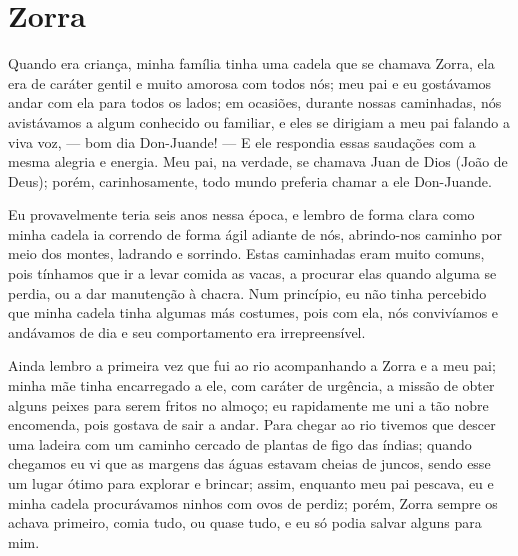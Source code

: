 \cleardoublepage
\newpage
{}
\chapter{Zorra}


Quando era criança, minha família tinha uma cadela que se chamava Zorra, ela era de caráter gentil e muito amorosa com todos nós; meu pai e eu gostávamos andar com ela para todos os lados; em ocasiões, durante nossas caminhadas, nós avistávamos a algum conhecido ou familiar, e eles se dirigiam a meu pai falando a viva voz, --- bom dia Don-Juande! --- E ele respondia essas saudações com a mesma alegria e energia.
Meu pai, na verdade, se chamava Juan de Dios (João de Deus); porém, carinhosamente, todo mundo preferia chamar a ele Don-Juande.


Eu provavelmente teria seis anos nessa época, e lembro de forma clara como minha cadela ia correndo de forma ágil adiante de nós, abrindo-nos caminho por meio dos montes, ladrando e sorrindo.
Estas caminhadas eram muito comuns, pois tínhamos que ir a levar comida as vacas, a procurar elas quando alguma se perdia, ou a dar manutenção à chacra.
Num princípio, eu não tinha percebido que minha cadela tinha algumas más costumes, pois com ela, nós convivíamos e andávamos de dia e seu comportamento era irrepreensível. 

Ainda lembro a primeira vez que fui ao rio acompanhando a Zorra e a meu pai; minha mãe tinha encarregado a ele, com caráter de urgência, a missão de obter alguns peixes para serem fritos no almoço; eu rapidamente me uni a tão nobre encomenda, pois gostava de sair a andar. 
Para chegar ao rio tivemos que descer uma ladeira com um caminho cercado de plantas de figo das índias; quando chegamos eu vi que as margens das águas estavam cheias de juncos, sendo esse um lugar ótimo para explorar e brincar; assim, enquanto meu pai pescava, eu e minha cadela procurávamos ninhos com ovos de perdiz; porém, Zorra sempre os achava primeiro, comia tudo, ou quase tudo, e eu só podia salvar alguns para mim.


